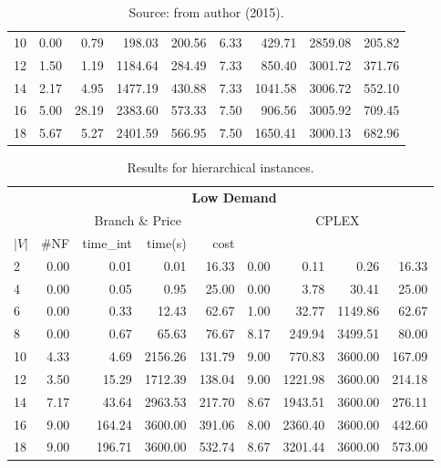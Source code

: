 \begin{table*}[h]
\begin{center}
\begin{tabular} {l | r r r r | r r r r }
10&   0.00 & 0.79 & 198.03 & 200.56 & 6.33 & 429.71 & 2859.08 & 205.82     \\
12&   1.50 & 1.19 & 1184.64 & 284.49 & 7.33 & 850.40 & 3001.72 & 371.76    \\
14&   2.17 & 4.95 & 1477.19 & 430.88 & 7.33 & 1041.58 & 3006.72 & 552.10   \\
16&   5.00 & 28.19 & 2383.60 & 573.33 & 7.50 & 906.56 & 3005.92 & 709.45   \\
18&   5.67 & 5.27 & 2401.59 & 566.95 & 7.50 & 1650.41 & 3000.13 & 682.96   \\ 
\hline
\end{tabular}\caption*{Source: from author (2015).} 
\end{center}
\end{table*}

\begin{table*}[h]
\small
\begin{center}
\caption{Results for hierarchical instances.}\label{tab:hier}
\begin{tabular} {l | r r r r | r r r r }
\hline
      &  \multicolumn{8}{c}{ \textbf{Low Demand} }                           \\
      &  \multicolumn{4}{c|}{Branch \& Price} & \multicolumn{4}{c}{CPLEX}    \\ 
$|V|$ & \#NF &  time\_int    &  time(s)       &  cost                         \\
\hline      
2&   0.00 & 0.01 & 0.01 & 16.33 & 0.00 & 0.11 & 0.26 & 16.33                     \\  
4&   0.00 & 0.05 & 0.95 & 25.00 & 0.00 & 3.78 & 30.41 & 25.00                    \\
6&   0.00 & 0.33 & 12.43 & 62.67 & 1.00 & 32.77 & 1149.86 & 62.67                \\
8&   0.00 & 0.67 & 65.63 & 76.67 & 8.17 & 249.94 & 3499.51 & 80.00               \\
10&   4.33 & 4.69 & 2156.26 & 131.79 & 9.00 & 770.83 & 3600.00 & 167.09          \\
12&   3.50 & 15.29 & 1712.39 & 138.04 & 9.00 & 1221.98 & 3600.00 & 214.18        \\
14&   7.17 & 43.64 & 2963.53 & 217.70 & 8.67 & 1943.51 & 3600.00 & 276.11        \\
16&   9.00 & 164.24 & 3600.00 & 391.06 & 8.00 & 2360.40 & 3600.00 & 442.60       \\
18&   9.00 & 196.71 & 3600.00 & 532.74 & 8.67 & 3201.44 & 3600.00 & 573.00       \\ 

\end{tabular}
\end{center}
\end{table*}

